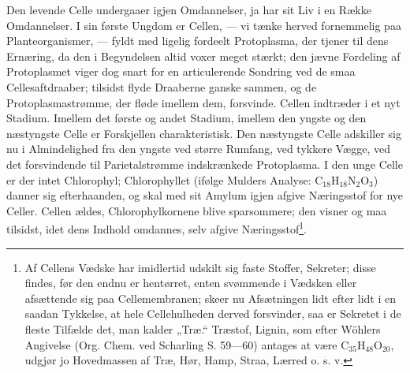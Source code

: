 \documentclass[12pt,a4paper]{book}
\begin{document}
Den levende Celle undergaaer igjen Omdannelser, ja har sit Liv i en
Række Omdannelser. I sin første Ungdom er Cellen, --- vi tænke
herved fornemmelig paa Planteorganismer, --- fyldt med ligelig
fordeelt Protoplasma, der tjener til dens Ernæring, da den i
Begyndelsen altid voxer meget stærkt; den jævne Fordeling af
Protoplasmet viger dog snart for en articulerende Sondring ved de
smaa Cellesaftdraaber; tilsidst flyde Draaberne ganske sammen, og
de Protoplasmastrømme, der fløde imellem dem, forsvinde. Cellen
indtræder i et nyt Stadium. Imellem det første og andet Stadium,
imellem den yngste og den næstyngste Celle er Forskjellen
charakteristisk. Den næstyngste Celle adskiller sig nu i
Almindelighed fra den yngste ved større Rumfang, ved tykkere
Vægge, ved det forsvindende til Parietalstrømme indskrænkede
Protoplasma. I den unge Celle er der intet Chlorophyl; Chlorophyllet
(ifølge Mulders Analyse: $\mathrm{C}_{18}\mathrm{H}_{18}\mathrm{N}_2\mathrm{O}_3$)
danner sig efterhaanden, og skal med sit Amylum igjen afgive
Næringsstof for nye Celler. Cellen ældes, Chlorophylkornene blive
sparsommere; den visner og maa tilsidst, idet dens Indhold
omdannes, selv afgive
Næringsstof\footnote{Af Cellens Vædske har imidlertid udskilt sig
faste Stoffer, Sekreter; disse findes, før den endnu er hentørret,
enten svømmende i Vædsken eller afsættende sig paa
Cellemembranen; skeer nu Afsætningen lidt efter lidt i en saadan
Tykkelse, at hele Cellehulheden derved forsvinder, saa er Sekretet
i de fleste Tilfælde det, man kalder „Træ.“ Træstof, Lignin, som
efter Wöhlers Angivelse (Org. Chem. ved Scharling S. 59---60)
antages at være $\mathrm{C}_{35}\mathrm{H}_{48}\mathrm{O}_{20}$,
udgjør jo Hovedmassen af Træ, Hør, Hamp, Straa, Lærred o. s. v.}.
\end{document}
